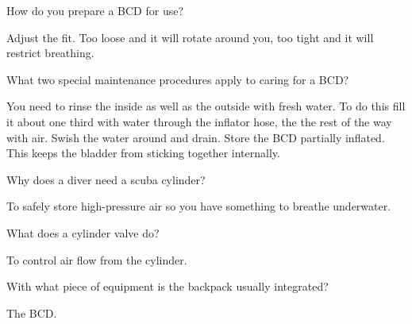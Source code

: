 	\begin{qanda}
		\begin{question}
How do you prepare a BCD for use?
		\end{question}

		\begin{answer}
Adjust the fit.  Too loose and it will rotate around you, too tight and it will restrict breathing.%
		\end{answer}
	\end{qanda}

	\begin{qanda}
		\begin{question}
What two special maintenance procedures apply to caring for a BCD?
		\end{question}

		\begin{answer}
You need to rinse the inside as well as the outside with fresh water.  To do this fill it about one third with water through the inflator hose, the the rest of the way with air.  Swish the water around and drain.  Store the BCD partially inflated.  This keeps the bladder from sticking together internally.
		\end{answer}
	\end{qanda}

	\begin{qanda}
		\begin{question}
Why does a diver need a scuba cylinder?
		\end{question}

		\begin{answer}
To safely store high-pressure air so you have something to breathe underwater.
		\end{answer}
	\end{qanda}

	\begin{qanda}
		\begin{question}
What does a cylinder valve do?
		\end{question}

		\begin{answer}
To control air flow from the cylinder.
		\end{answer}
	\end{qanda}

	\begin{qanda}
		\begin{question}
With what piece of equipment is the backpack usually integrated?
		\end{question}

		\begin{answer}
The BCD.
		\end{answer}
	\end{qanda}

